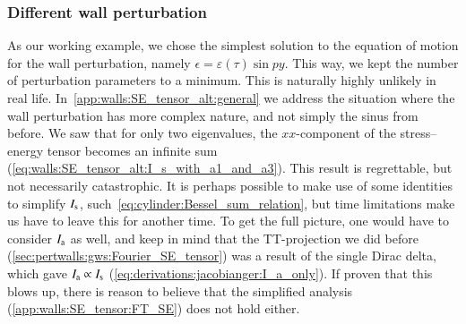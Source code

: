 \subsubsection{Different wall perturbation}
    As our working example, we chose the simplest solution to the equation of motion for the wall perturbation, namely $\epsilon= \varepsilon(\tau)\sin{py}$. This way, we kept the number of perturbation parameters to a minimum. This is naturally highly unlikely in real life. 
    In~\cref{app:walls:SE_tensor_alt:general} we address the situation where the wall perturbation has more complex nature, and not simply the sinus from before. We saw that for only two eigenvalues, the $xx$-component of the stress--energy tensor becomes an infinite sum (\cref{eq:walls:SE_tensor_alt:I_s_with_a1_and_a3}). %
    This result is regrettable, but not necessarily catastrophic. %
    It is perhaps possible to make use of some identities to simplify $I_\mathrm{s}$, such~\cref{eq:cylinder:Bessel_sum_relation}, 
    but time limitations make us have to leave this for another time. To get the full picture, one would have to consider $I_\mathrm{a}$ as well, and keep in mind that the TT-projection we did before (\cref{sec:pertwalls:gws:Fourier_SE_tensor}) was a result of the single Dirac delta, which gave $I_\mathrm{a}\propto I_\mathrm{s}$ (\cref{eq:derivations:jacobianger:I_a_only}). %
    If proven that this blows up, there is reason to believe that the simplified analysis (\cref{app:walls:SE_tensor:FT_SE}) does not hold either. 




